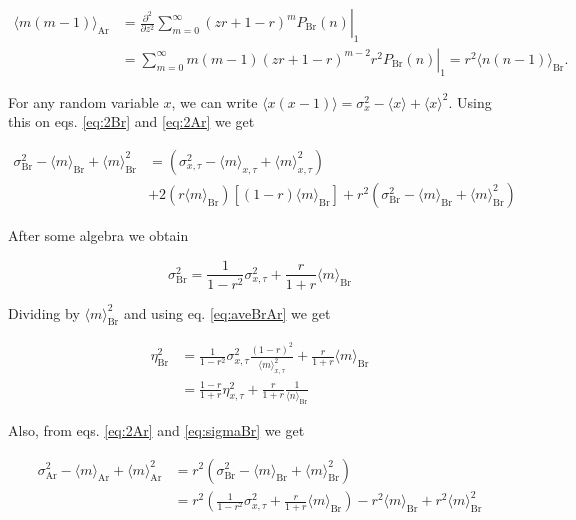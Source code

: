 \begin{equation}
  \label{eq:2Ar}
  \begin{split}
    \langle m(m-1)\rangle_\text{Ar} &= \left.\frac{\partial^2}{\partial z^2}\sum_{m=0}^\infty(zr+1-r)^mP_\text{Br}(n)\right|_1\\
    &= \left.\sum_{m=0}^\infty m(m-1)(zr+1-r)^{m-2}r^2P_\text{Br}(n)\right|_1 = r^2\langle n(n-1)\rangle_\text{Br}.
  \end{split}
\end{equation}

For any random variable $x$, we can write $\langle x(x-1)\rangle = \sigma_x^2 - \langle x\rangle + \langle x\rangle^2$. Using this on eqs. \ref{eq:2Br} and \ref{eq:2Ar} we get

\begin{equation*}
  \begin{split}
  \sigma^2_\text{Br}- \langle m\rangle_\text{Br} + \langle m\rangle^2_\text{Br} &= \left( \sigma^2_{x,\tau} - \langle m\rangle_{x,\tau} + \langle m\rangle_{x,\tau}^2\right)\\
&+ 2\left(r\langle m\rangle_\text{Br}\right)\left[(1-r)\langle m\rangle_\text{Br}\right]+r^2\left(\sigma^2_\text{Br}- \langle m\rangle_\text{Br} + \langle m\rangle^2_\text{Br}\right)
  \end{split}
\end{equation*}

After some algebra we obtain

\begin{equation}
  \label{eq:sigmaBr}
  \sigma^2_\text{Br} = \frac{1}{1-r^2}\sigma^2_{x,\tau}+\frac{r}{1+r}\langle m\rangle_\text{Br}
\end{equation}

Dividing by $\langle m\rangle_\text{Br}^2$ and using eq. \ref{eq:aveBrAr} we get

\begin{equation}
  \begin{split}
    \eta_\text{Br}^2 &= \frac{1}{1-r^2}\sigma_{x,\tau}^2\frac{(1-r)^2}{\langle m\rangle_{x,\tau}^2} + \frac{r}{1+r}\langle m\rangle_\text{Br}\\
    & = \frac{1-r}{1+r}\eta_{x,\tau}^2+\frac{r}{1+r}\frac{1}{\langle n\rangle_\text{Br}}
  \end{split}
\end{equation}

Also, from eqs. \ref{eq:2Ar} and \ref{eq:sigmaBr} we get

\begin{equation}
  \begin{split}
    \sigma^2_\text{Ar} - \langle m\rangle_\text{Ar} + \langle m\rangle_\text{Ar}^2 &= r^2\left(\sigma^2_\text{Br}- \langle m\rangle_\text{Br} + \langle m\rangle^2_\text{Br}\right)\\
  &=r^2\left(\frac{1}{1-r^2}\sigma^2_{x,\tau}+\frac{r}{1+r}\langle m\rangle_\text{Br}\right)-r^2\langle m\rangle_\text{Br} + r^2\langle m\rangle^2_\text{Br}
  \end{split}
\end{equation}

